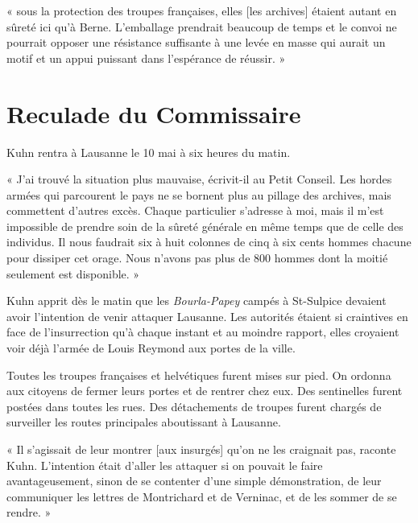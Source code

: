 \documentclass[french,twoside]{book} %
\newenvironment{quoteblock}%
  {\begin{quoting}}
  {\end{quoting}}
\newenvironment{quotebar}{%
    \def\FrameCommand{{\color{rubric!10!}\vrule width 0.5em} \hspace{0.9em}}%
    \def\OuterFrameSep{\itemsep} %
    \MakeFramed {\advance\hsize-\width \FrameRestore}
  }%
  {%
    \endMakeFramed
  }
\renewenvironment{quoteblock}%
  {%
    \savenotes
    \setstretch{0.9}
    \begin{quotebar}
  }
  {%
    \end{quotebar}
    \spewnotes
  }
\begin{document}
\begin{quoteblock}
\noindent « sous la protection des troupes françaises, elles [les archives] étaient autant en sûreté ici qu’à Berne. L’emballage prendrait beaucoup de temps et le convoi ne pourrait opposer une résistance suffisante à une levée en masse qui aurait un motif et un appui puissant dans l’espérance de réussir. »\end{quoteblock}

\section[Reculade du Commissaire]{Reculade du Commissaire}
\noindent Kuhn rentra à Lausanne le 10 mai à six heures du matin.\par

\begin{quoteblock}
 \noindent « J’ai trouvé la situation plus mauvaise, écrivit-il au Petit Conseil. Les hordes armées qui parcourent le pays ne se bornent plus au pillage des archives, mais commettent d’autres excès. Chaque particulier s’adresse à moi, mais il m’est impossible de prendre soin de la sûreté générale en même temps que de celle des individus. Il nous faudrait six à huit colonnes de cinq à six cents hommes chacune pour dissiper cet orage. Nous n’avons pas plus de 800 hommes dont la moitié seulement est disponible. »
 \end{quoteblock}

\noindent Kuhn apprit dès le matin que les \emph{Bourla-Papey} campés à St-Sulpice devaient avoir l’intention de venir attaquer Lausanne. Les autorités étaient si craintives en face de l’insurrection qu’à chaque instant et au moindre rapport, elles croyaient voir déjà l’armée de Louis Reymond aux portes de la ville.\par
Toutes les troupes françaises et helvétiques furent mises sur pied. On ordonna aux citoyens de fermer leurs portes et de rentrer chez eux. Des sentinelles furent postées dans toutes les rues. Des détachements de troupes furent chargés de surveiller les routes principales aboutissant à Lausanne.\par

\begin{quoteblock}
 \noindent « Il s’agissait de leur montrer [aux insurgés] qu’on ne les craignait pas, raconte Kuhn. L’intention était d’aller les attaquer si on pouvait le faire avantageusement, sinon de se contenter d’une simple démonstration, de leur communiquer les lettres de Montrichard et de Verninac, et de les sommer de se rendre. »
 \end{quoteblock}
\end{document}
